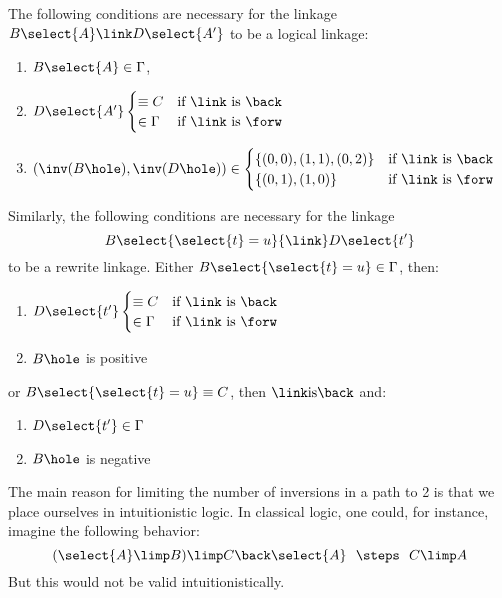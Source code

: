 \begin{condition}[Polarity]\label{cond:pol}
  The following conditions are necessary for the linkage $B\select{A}\link
  D\select{A'}$ to be a logical linkage:
  \begin{enumerate}
    \item $B\select{A}\in \Gamma$,
    \item $D\select{A'} \begin{cases}
      \equiv C & \text{if $\link$ is $\back$} \\
      \in \Gamma & \text{if $\link$ is $\forw$}
      \end{cases}$
    \item $(\inv(B\hole), \inv(D\hole)) \in \begin{cases}
      \{(0,0),(1,1),(0,2)\} & \text{if $\link$ is $\back$} \\
      \{(0,1),(1,0)\} & \text{if $\link$ is $\forw$}
    \end{cases}$
  \end{enumerate}

  Similarly, the following conditions are necessary for the linkage
  $$B\select{\select{t} = u} {\link} D\select{t'}$$ to be a rewrite linkage.
  Either $B\select{\select{t} = u}\in \Gamma$, then:
  \begin{enumerate}
    \item $D\select{t'} \begin{cases}
      \equiv C & \text{if $\link$ is $\back$} \\
      \in \Gamma & \text{if $\link$ is $\forw$}
      \end{cases}$
    \item $B\hole$ is positive
  \end{enumerate}
  or $B\select{\select{t} = u} \equiv C$, then ${\link} \text{is} \back$ and:
  \begin{enumerate}
    \item $D\select{t'} \in \Gamma$
    \item $B\hole$ is negative
  \end{enumerate}
\end{condition}

\begin{remark}
The main reason for limiting the number of inversions in a path to 2
is that we place ourselves in intuitionistic logic. In classical
logic, one could, for instance, imagine the following behavior:
$$(\select{A}\limp B)\limp C\back \select{A}~~\steps~~ C\limp A$$
But this would not be valid intuitionistically.
\end{remark}

